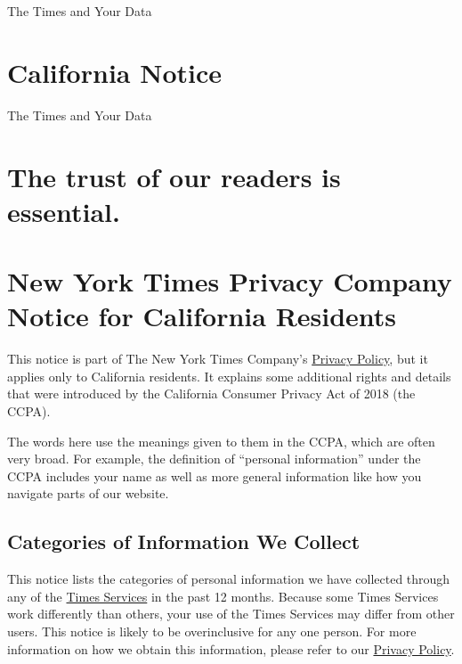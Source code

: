 The Times and Your Data

\hypertarget{california-notice}{%
\section{California Notice}\label{california-notice}}

The Times and Your Data

\hypertarget{the-trust-of-our-readers-is-essential}{%
\section{The trust of our readers is
essential.}\label{the-trust-of-our-readers-is-essential}}

\hypertarget{new-york-times-privacy-company-notice-for-california-residents}{%
\section{New York Times Privacy Company Notice for California
Residents}\label{new-york-times-privacy-company-notice-for-california-residents}}

This notice is part of The New York Times Company's
\href{/privacy/privacy-policy}{Privacy Policy}, but it applies only to
California residents. It explains some additional rights and details
that were introduced by the California Consumer Privacy Act of 2018 (the
CCPA).

The words here use the meanings given to them in the CCPA, which are
often very broad. For example, the definition of ``personal
information'' under the CCPA includes your name as well as more general
information like how you navigate parts of our website.

\hypertarget{categories-of-information-we-collect}{%
\subsection{Categories of Information We
Collect}\label{categories-of-information-we-collect}}

This notice lists the categories of personal information we have
collected through any of the
\href{http://www.nytimes3xbfgragh.onion/privacy/privacy-policy}{Times
Services} in the past 12 months. Because some Times Services work
differently than others, your use of the Times Services may differ from
other users. This notice is likely to be overinclusive for any one
person. For more information on how we obtain this information, please
refer to our
\href{http://www.nytimes3xbfgragh.onion/privacy/privacy-policy\#what-information-do-we-gather-about-you}{Privacy
Policy}.

